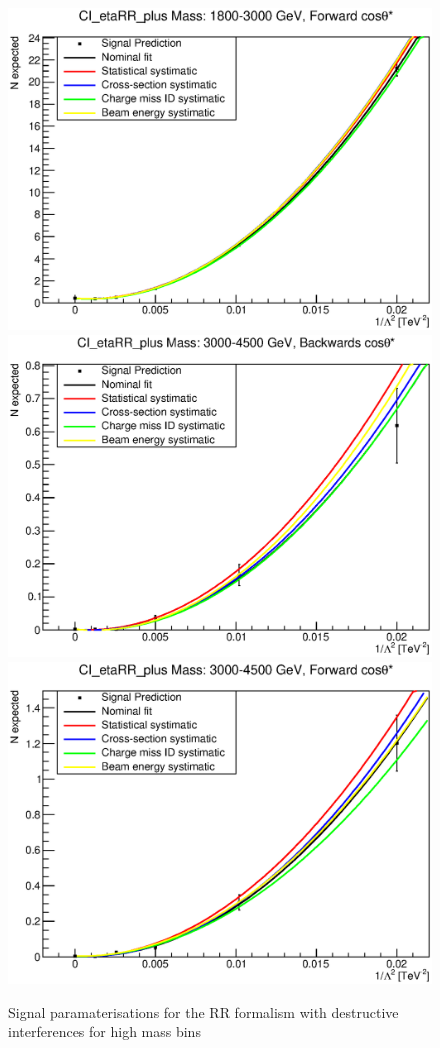 \begin{figure}[ht]
			\includegraphics[width=0.49\linewidth]{images/thesis_fits/CI_2D_etaRR_plus_Mass_1800-3000_GeV_CTS_0_1.eps}
			\includegraphics[width=0.49\linewidth]{images/thesis_fits/CI_2D_etaRR_plus_Mass_3000-4500_GeV_CTS_-1_0.eps}
			\includegraphics[width=0.49\linewidth]{images/thesis_fits/CI_2D_etaRR_plus_Mass_3000-4500_GeV_CTS_0_1.eps}
		\caption{Signal paramaterisations for the RR formalism with destructive interferences for high mass bins}
		\label{fig:parm_RR_p_2}
	\end{figure}
















